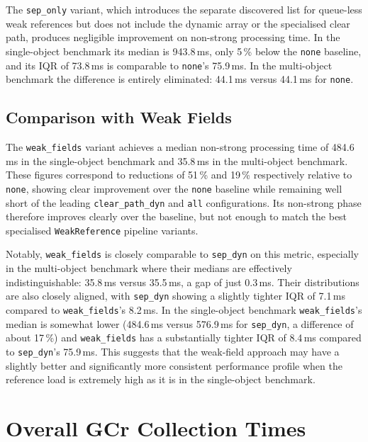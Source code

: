 The \texttt{sep\_only} variant, which introduces the separate discovered list for queue-less weak references but does not include the dynamic array or the specialised clear path, produces negligible improvement on non-strong processing time. In the single-object benchmark its median is 943.8\,ms, only 5\,\% below the \texttt{none} baseline, and its IQR of 73.8\,ms is comparable to \texttt{none}'s 75.9\,ms. In the multi-object benchmark the difference is entirely eliminated: 44.1\,ms versus 44.1\,ms for \texttt{none}.

\subsection{Comparison with Weak Fields}
\label{subsec:analysis-nonstrong-wf}

The \texttt{weak\_fields} variant achieves a median non-strong processing time of 484.6\,ms in the single-object benchmark and 35.8\,ms in the multi-object benchmark. These figures correspond to reductions of 51\,\% and 19\,\% respectively relative to \texttt{none}, showing clear improvement over the \texttt{none} baseline while remaining well short of the leading \texttt{clear\_path\_dyn} and \texttt{all} configurations. Its non-strong phase therefore improves clearly over the baseline, but not enough to match the best specialised \texttt{WeakReference} pipeline variants.

Notably, \texttt{weak\_fields} is closely comparable to \texttt{sep\_dyn} on this metric, especially in the multi-object benchmark where their medians are effectively indistinguishable: 35.8\,ms versus 35.5\,ms, a gap of just 0.3\,ms. Their distributions are also closely aligned, with \texttt{sep\_dyn} showing a slightly tighter \ac{IQR} of 7.1\,ms compared to \texttt{weak\_fields}'s 8.2\,ms. In the single-object benchmark \texttt{weak\_fields}'s median is somewhat lower (484.6\,ms versus 576.9\,ms for \texttt{sep\_dyn}, a difference of about 17\,\%) and \texttt{weak\_fields} has a substantially tighter IQR of 8.4\,ms compared to \texttt{sep\_dyn}'s 75.9\,ms. This suggests that the weak-field approach may have a slightly better and significantly more consistent performance profile when the reference load is extremely high as it is in the single-object benchmark.

\section{Overall GCr Collection Times}
\label{sec:analysis-overall}

